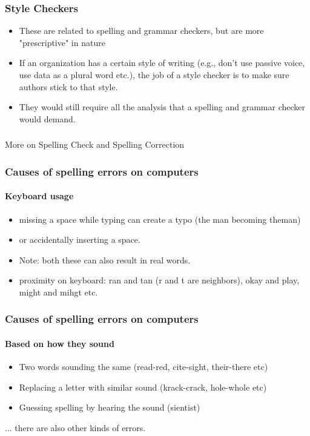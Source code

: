 \documentclass{beamer}
\begin{document}
\begin{frame}
\frametitle{Style Checkers}
\begin{itemize}
\item These are related to spelling and grammar checkers, but are more "prescriptive" in nature
\item If an organization has a certain style of writing (e.g., don't use passive voice, use data as a plural word etc.), the job of a style checker is to make sure authors stick to that style. \pause
\item They would still require all the analysis that a spelling and grammar checker would demand. 
\end{itemize}
\end{frame}

\begin{frame}
\frametitle{}
\begin{center}
\Large More on Spelling Check and Spelling Correction
\end{center}
\end{frame}

\begin{frame}
\frametitle{Causes of spelling errors on computers}
\framesubtitle{Keyboard usage}
\begin{itemize}
\item missing a space while typing can create a typo (the man becoming theman)
\item or accidentally inserting a space. 
\item Note: both these can also result in real words.\pause
\item proximity on keyboard: ran and tan (r and t are neighbors), okay and play, might and mihgt etc. 
\end{itemize}
\end{frame}

\begin{frame}
\frametitle{Causes of spelling errors on computers}
\framesubtitle{Based on how they sound}
\begin{itemize}
\item Two words sounding the same (read-red, cite-sight, their-there etc) \pause
\item Replacing a letter with similar sound (krack-crack, hole-whole etc) \pause
\item Guessing spelling by hearing the sound (sientist)
\end{itemize}
... there are also other kinds of errors. 
\end{frame}
\end{document}
